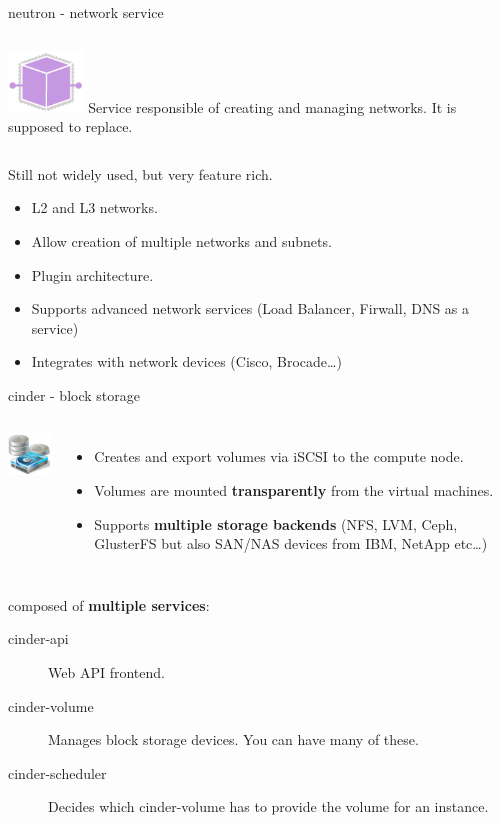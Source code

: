 \documentclass[english,serif,mathserif,usenames,dvipsnames]{beamer}
\begin{document}
\begin{frame}
  {neutron - network service}

  \begin{columns}
    \column{2cm}
    \includegraphics[width=2cm]{openstack-networking-icon.png}
    \column{8cm}
    Service responsible of creating and managing networks. It is
    supposed to replace.
  \end{columns}

  \+\+
  Still not widely used, but very feature rich.


  \begin{itemize}
  \item L2 and L3 networks.
  \item Allow creation of multiple networks and subnets.
  \item Plugin architecture.
  \item Supports advanced network services (Load Balancer, Firwall,
    DNS as a service)
  \item Integrates with network devices (Cisco, Brocade\ldots)
  \end{itemize}
\end{frame}


\begin{frame}
  {cinder - block storage}
  \begin{columns}
    \column{2cm}
    \includegraphics[width=2cm]{block_storage.png}
    \column{9cm}
    \begin{itemize}
    \item Creates and export volumes via iSCSI to the compute node.
    \item Volumes are mounted \textbf{transparently} from the virtual
      machines.
    \item Supports \textbf{multiple storage backends} (NFS, LVM, Ceph,
      GlusterFS but also SAN/NAS devices from IBM, NetApp etc\ldots )
    \end{itemize}
  \end{columns}

  \+
  composed of \textbf{multiple services}:
  \begin{description}
  \item[cinder-api] Web API frontend.
  \item[cinder-volume] Manages block storage devices. You can have
    many of these.
  \item[cinder-scheduler] Decides which cinder-volume has to provide
    the volume for an instance.
  \end{description}
\end{frame}
\end{document}
